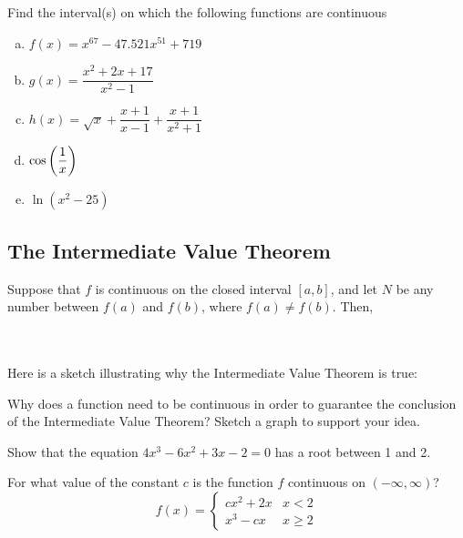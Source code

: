 \documentclass[notes]{subfiles}
\begin{document}
		\begin{ex}
			Find the interval(s) on which the following functions are continuous
			\begin{enumerate}[(a)]
				\item \(f(x) = x^{67}-47.521x^{51}+719\)
					
				\item \(g(x) = \dfrac{x^2+2x+17}{x^2-1}\)
					
				\item \(h(x) = \sqrt{x} + \dfrac{x+1}{x-1} + \dfrac{x+1}{x^2+1}\)
					
				\item \(\cos\left( \dfrac{1}{x}\right)\)
					
				\item \(\ln (x^2 - 25)\)
			\end{enumerate}
		\end{ex}
			\newpage
			
	\subsection*{The Intermediate Value Theorem}
		\begin{thm}
			Suppose that $f$ is continuous on the closed interval $[a,b]$, and let $N$ be any number between $f(a)$ and $f(b)$, where $f(a)\neq f(b)$.  Then, \\ \\ \\
		\end{thm}
		Here is a sketch illustrating why the Intermediate Value Theorem is true:
			\vs{1}	

		\begin{question}
			Why does a function need to be continuous in order to guarantee the conclusion of the Intermediate Value Theorem?  Sketch a graph to support your idea.
		\end{question}
			\vs{1}
			\newpage
			
		\begin{ex}
			Show that the equation \(4x^3-6x^2+3x-2 = 0\) has a root between 1 and 2.
		\end{ex}
			\vs{1}
			
		\begin{ex}
			For what value of the constant \(c\) is the function \(f\) continuous on \((-\infty,\infty)\)?
			\[f(x) = \begin{cases} cx^2+2x & x < 2 \\ x^3-cx & x\geq 2\end{cases}\]
		\end{ex}
			\vs{1}
			\newpage
\end{document}
